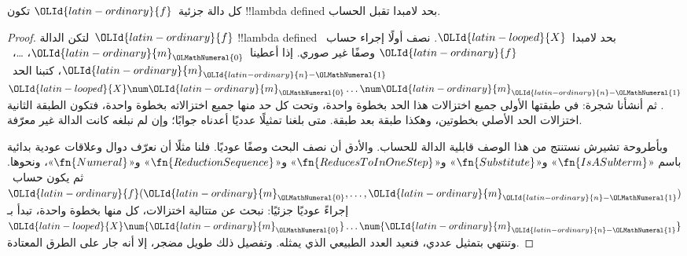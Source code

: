 \documentclass[../../../include/open-logic-section]{subfiles}
\begin{document}

\begin{thm}
كل دالة جزئية~$\OLId{latin-ordinary}{f}$ تكون !!{lambda defined} بحد لامبدا تقبل الحساب.
\end{thm}

\begin{proof}
لتكن الدالة~$\OLId{latin-ordinary}{f}$ !!{lambda defined} بحد لامبدا~$\OLId{latin-looped}{X}$.
نصف أولًا إجراء حساب~$\OLId{latin-ordinary}{f}$ وصفًا غير صوري.
إذا أعطينا~$\OLId{latin-ordinary}{m}_\OLMathNumeral{0}$، \dots،~$\OLId{latin-ordinary}{m}_{\OLId{latin-ordinary}{n}-\OLMathNumeral{1}}$،
كتبنا الحد~$\OLId{latin-looped}{X} \num \OLId{latin-ordinary}{m}_\OLMathNumeral{0} \ldots \num \OLId{latin-ordinary}{m}_{\OLId{latin-ordinary}{n}-\OLMathNumeral{1}}$.
ثم أنشأنا شجرة: في طبقتها الأولى جميع اختزالات هذا الحد
بخطوة واحدة، وتحت كل حد منها جميع اختزالاته بخطوة واحدة،
فتكون الطبقة الثانية اختزالات الحد الأصلي بخطوتين،
وهكذا طبقة بعد طبقة. متى بلغنا تمثيلًا عدديًا أعدناه جوابًا؛
وإن لم نبلغه كانت الدالة غير معرّفة.

وبأطروحة تشيرش نستنتج من هذا الوصف قابلية الدالة للحساب.
والأدق أن نصف البحث وصفًا عوديًا. فلنا مثلًا أن نعرّف دوال
وعلاقات عودية بدائية باسم
«$\fn{IsASubterm}$» و«$\fn{Substitute}$»
و«$\fn{ReducesToInOneStep}$» و«$\fn{ReductionSequence}$»
و«$\fn{Numeral}$»، ونحوها.
ثم يكون حساب~$\OLId{latin-ordinary}{f}(\OLId{latin-ordinary}{m}_\OLMathNumeral{0}, \dots, \OLId{latin-ordinary}{m}_{\OLId{latin-ordinary}{n}-\OLMathNumeral{1}})$ إجراءً عوديًا جزئيًا:
نبحث عن متتالية اختزالات، كل منها بخطوة واحدة، تبدأ
بـ$\OLId{latin-looped}{X} \num{\OLId{latin-ordinary}{m}_\OLMathNumeral{0}} \dots \num{\OLId{latin-ordinary}{m}_{\OLId{latin-ordinary}{n}-\OLMathNumeral{1}}}$ وتنتهي بتمثيل عددي،
فنعيد العدد الطبيعي الذي يمثله.
وتفصيل ذلك طويل مضجر، إلا أنه جار على الطرق المعتادة.
\end{proof}
\end{document}
